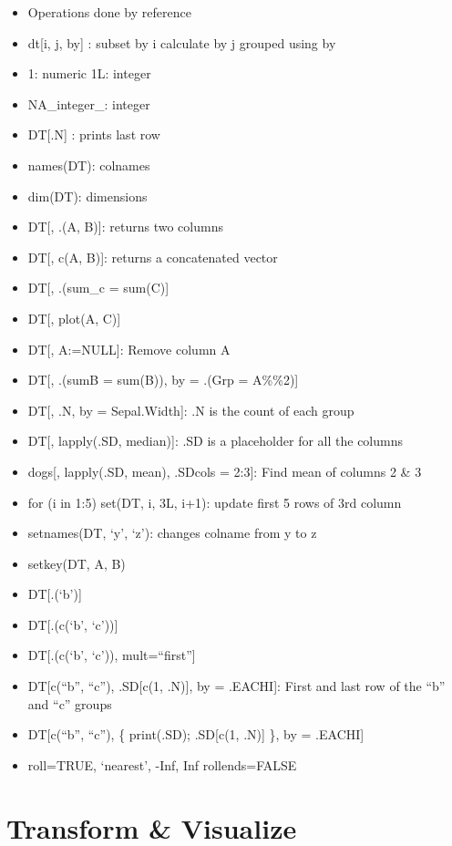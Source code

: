 \documentclass[]{book}
\theoremstyle{definition}
\theoremstyle{definition}
\theoremstyle{definition}
\theoremstyle{remark}
\begin{document}
\begin{itemize}
\item
  Operations done by reference
\item
  dt{[}i, j, by{]} : subset by i calculate by j grouped using by
\item
  1: numeric \textbar{} 1L: integer
\item
  NA\_integer\_: integer
\item
  DT{[}.N{]} : prints last row
\item
  names(DT): colnames
\item
  dim(DT): dimensions
\item
  DT{[}, .(A, B){]}: returns two columns
\item
  DT{[}, c(A, B){]}: returns a concatenated vector
\item
  DT{[}, .(sum\_c = sum(C){]}
\item
  DT{[}, plot(A, C){]}
\item
  DT{[}, A:=NULL{]}: Remove column A
\item
  DT{[}, .(sumB = sum(B)), by = .(Grp = A\%\%2){]}
\item
  DT{[}, .N, by = Sepal.Width{]}: .N is the count of each group
\item
  DT{[}, lapply(.SD, median){]}: .SD is a placeholder for all the
  columns
\item
  dogs{[}, lapply(.SD, mean), .SDcols = 2:3{]}: Find mean of columns 2
  \& 3
\item
  for (i in 1:5) set(DT, i, 3L, i+1): update first 5 rows of 3rd column
\item
  setnames(DT, `y', `z'): changes colname from y to z
\item
  setkey(DT, A, B)
\item
  DT{[}.(`b'){]}
\item
  DT{[}.(c(`b', `c')){]}
\item
  DT{[}.(c(`b', `c')), mult=``first''{]}
\item
  DT{[}c(``b'', ``c''), .SD{[}c(1, .N){]}, by = .EACHI{]}: First and
  last row of the ``b'' and ``c'' groups
\item
  DT{[}c(``b'', ``c''), \{ print(.SD); .SD{[}c(1, .N){]} \}, by =
  .EACHI{]}
\item
  roll=TRUE, `nearest', -Inf, Inf \textbar{} rollends=FALSE
\end{itemize}

\chapter{Transform \& Visualize}\label{transform-visualize}
\end{document}

